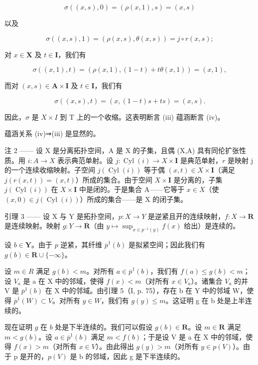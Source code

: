 \[
\sigma ((x, s), 0) = (\rho (x, 1), s) = (x, s)
\]

以及

\[
\sigma ((x, s), 1) = (\rho (x, s), \theta (x, s)) = j \circ r (x, s);
\]

对 \(x\in \mathbf{X}\) 及 \(t\in \mathbf{I}\)，我们有

\[
\sigma ((x, 1), t) = (\rho (x, 1), (1 - t) + t \theta (x, 1)) = (x, 1),
\]

而对 \((x,s)\in\mathbf{A}\times\mathbf{I}\) 及 \(t\in\mathbf{I}\)，我们有

\[
\sigma ((x, s), t) = (x, (1 - t) s + t s) = (x, s).
\]

因此，\(\sigma\) 是 \(X\times I\) 到 T 上的一个收缩。这表明断言 (iii) 蕴涵断言 (iv)。

蕴涵关系 (iv)⇒(iii) 是显然的。

注 2 —— 设 X 是分离拓扑空间，A 是 X 的子集，且偶 (X,A) 具有同伦扩张性质。用 \(i\colon A\to X\) 表示典范单射。设 \(j\colon\operatorname{Cyl}(i)\to X\times\mathbf{I}\) 是典范单射，\(r\) 是映射 j 的一个连续收缩映射。子空间 \(j(\operatorname{Cyl}(i))\) 等于偶 \((x,t)\in X\times\mathbf{I}\)（满足 \(j(r(x,t))=(x,t)\)）所成的集合。由于空间 \(X\times\mathbf{I}\) 是分离的，子集 \(j(\operatorname{Cyl}(i))\) 在 \(X\times\mathbf{I}\) 中是闭的。于是集合 A——它等于 \(x\in X\)（使 \((x,0)\in j(\operatorname{Cyl}(i))\)）所成的集合——是 X 的闭子集。

引理 3 —— 设 X 与 Y 是拓扑空间，\(p \colon X \to Y\) 是逆紧且开的连续映射，\(f \colon X \to \mathbf{R}\) 是连续映射。映射 \(g \colon Y \to \overline{\mathbf{R}}\)（由 \(y \mapsto \sup_{x\in p^{-1}(y)} f(x)\) 给出）是连续的。

设 \(b \in \mathbf{Y}\)。由于 \(p\) 逆紧，其纤维 \(\overline{p}^1(b)\) 是拟紧空间；因此我们有 \(g(b) \in \mathbf{R} \cup \{-\infty\}\)。

设 \(m \in R\) 满足 \(g(b) < m\)。对所有 \(a \in \overline{p}^{1}(b)\)，我们有 \(f(a) \leqslant g(b) < m\)；设 \(V_{a}\) 是 a 在 X 中的邻域，使得 \(f(x) < m\)（对所有 \(x \in V_{a}\)）。诸集合 \(V_{a}\) 的并 V 是 \(\overline{p}^{1}(b)\) 在 X 中的邻域。由引理 5（I, p. 75），存在 b 在 Y 中的邻域 W，使得 \(\overline{p}^{1}(W) \subset V\)。对所有 \(y \in W\)，我们有 \(g(y) \leqslant m\)。这证明 g 在 b 处是上半连续的。

现在证明 \(g\) 在 \(b\) 处是下半连续的。我们可以假设 \(g(b)\in\mathbf{R}\)。设 \(m\in\mathbf{R}\) 满足 \(m<g(b)\)。设 \(a\in\overline{p}^1(b)\) 满足 \(m<f(b)\)；于是设 V 是 a 在 X 中的邻域，使得 \(f(x)>m\)（对所有 \(x\in V\)）。由此得出 \(g(y)>m\)（对所有 \(y\in p(V)\)）。由于 p 是开的，\(p(V)\) 是 b 的邻域，因此 g 是下半连续的。

